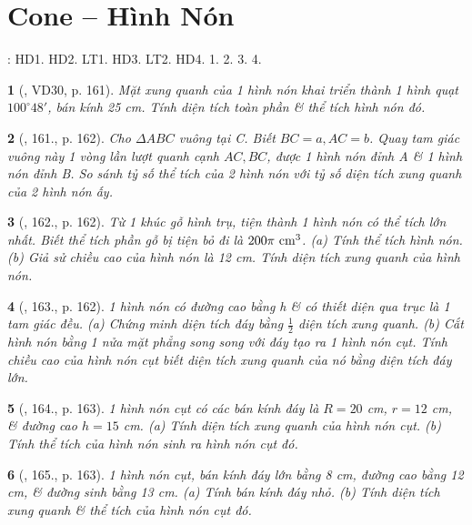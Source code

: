 \documentclass{article}
\newtheorem{baitoan}{}
\begin{document}
\section{Cone -- Hình Nón}
\cite[Chap. X, \S2, pp. 98--103]{SGK_Toan_9_Canh_Dieu_tap_1}: HD1. HD2. LT1. HD3. LT2. HD4. 1. 2. 3. 4.

\begin{baitoan}[\cite{Tuyen_Toan_9_old}, VD30, p. 161]
	Mặt xung quanh của 1 hình nón khai triển thành 1 hình quạt $100^\circ48'$, bán kính {\rm25 cm}. Tính diện tích toàn phần \& thể tích hình nón đó.
\end{baitoan}

\begin{baitoan}[\cite{Tuyen_Toan_9_old}, 161., p. 162]
	Cho $\Delta ABC$ vuông tại C. Biết $BC = a,AC = b$. Quay tam giác vuông này 1 vòng lần lượt quanh cạnh $AC,BC$, được 1 hình nón đỉnh A \& 1 hình nón đỉnh B. So sánh tỷ số thể tích của 2 hình nón với tỷ số diện tích xung quanh của 2 hình nón ấy.
\end{baitoan}

\begin{baitoan}[\cite{Tuyen_Toan_9_old}, 162., p. 162]
	Từ 1 khúc gỗ hình trụ, tiện thành 1 hình nón có thể tích lớn nhất. Biết thể tích phần gỗ bị tiện bỏ đi là $200\pi\ {\rm cm}^3$. (a) Tính thể tích hình nón. (b) Giả sử chiều cao của hình nón là {\rm12 cm}. Tính diện tích xung quanh của hình nón.
\end{baitoan}

\begin{baitoan}[\cite{Tuyen_Toan_9_old}, 163., p. 162]
	1 hình nón có đường cao bằng h \& có thiết diện qua trục là 1 tam giác đều. (a) Chứng minh diện tích đáy bằng $\frac{1}{2}$ diện tích xung quanh. (b) Cắt hình nón bằng 1 nửa mặt phẳng song song với đáy tạo ra 1 hình nón cụt. Tính chiều cao của hình nón cụt biết diện tích xung quanh của nó bằng diện tích đáy lớn.
\end{baitoan}

\begin{baitoan}[\cite{Tuyen_Toan_9_old}, 164., p. 163]
	1 hình nón cụt có các bán kính đáy là $R = 20$ {\rm cm}, $r = 12$ {\rm cm}, \& đường cao $h = 15$ {\rm cm}. (a) Tính diện tích xung quanh của hình nón cụt. (b) Tính thể tích của hình nón sinh ra hình nón cụt đó.
\end{baitoan}

\begin{baitoan}[\cite{Tuyen_Toan_9_old}, 165., p. 163]
	1 hình nón cụt, bán kính đáy lớn bằng {\rm8 cm}, đường cao bằng {\rm12 cm}, \& đường sinh bằng {\rm13 cm}. (a) Tính bán kính đáy nhỏ. (b) Tính diện tích xung quanh \& thể tích của hình nón cụt đó.
\end{baitoan}
\end{document}
